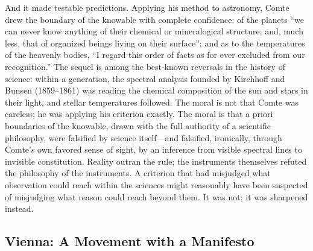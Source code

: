 And it made testable predictions. Applying his method to astronomy, Comte drew the boundary of the knowable with complete confidence: of the planets ``we can never know anything of their chemical or mineralogical structure; and, much less, that of organized beings living on their surface''; and as to the temperatures of the heavenly bodies, ``I regard this order of facts as for ever excluded from our recognition.'' The sequel is among the best-known reversals in the history of science: within a generation, the spectral analysis founded by Kirchhoff and Bunsen (1859--1861) was reading the chemical composition of the sun and stars in their light, and stellar temperatures followed. The moral is not that Comte was careless; he was applying his criterion exactly. The moral is that a priori boundaries of the knowable, drawn with the full authority of a scientific philosophy, were falsified by science itself---and falsified, ironically, through Comte's own favored sense of sight, by an inference from visible spectral lines to invisible constitution. Reality outran the rule; the instruments themselves refuted the philosophy of the instruments. A criterion that had misjudged what observation could reach within the sciences might reasonably have been suspected of misjudging what reason could reach beyond them. It was not; it was sharpened instead.

\subsection{Vienna: A Movement with a Manifesto}

